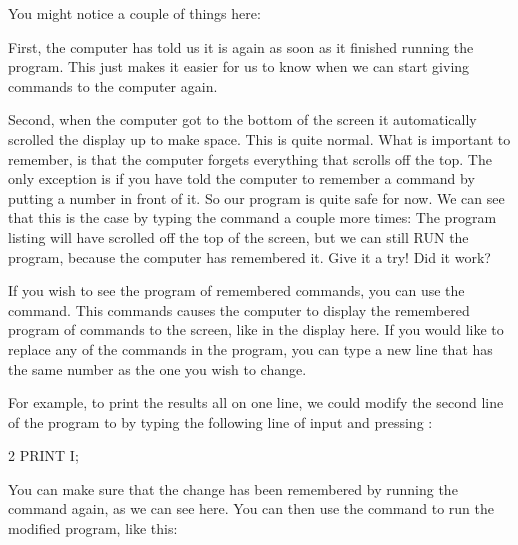  You might notice a couple of things here:

  First, the computer has told us it is  again
  as soon as it finished running the program. This just makes it easier for us to know when we
  can start giving commands to the computer again.

  Second, when the computer got to the bottom of the screen
  it automatically scrolled the display up to make space.  This is quite normal.  What is important
  to remember, is that the computer forgets everything that scrolls off the top.  The only exception
  is if you have told the computer to remember a command by putting a number in front of it.  So
  our program is quite safe for now. We can see that this is the case by typing the  command a
  couple more times: The program listing will have scrolled off the top of the screen, but we can
  still RUN the program, because the computer has remembered it.  Give it a try!
  Did it work?

\needspace{4cm} %
  If you wish to see the program of remembered commands, you can use the 
  command.  This commands causes the computer to display the remembered program of commands to the screen, like in the display here.
  If you would like to replace any of the commands in the program, you can type a new line that has the same number as the one you
  wish to change.


\needspace{4cm} %
  For example, to print the results all on one line, we could modify the second line of the program to  by
  typing the following line of input and pressing :



\begin{screenoutput}
2 PRINT I;
\end{screenoutput}


\needspace{4cm} %

You can make sure that the change has been remembered by running the  command again, as we can see here.
You can then use the  command to run the modified
program, like this:

